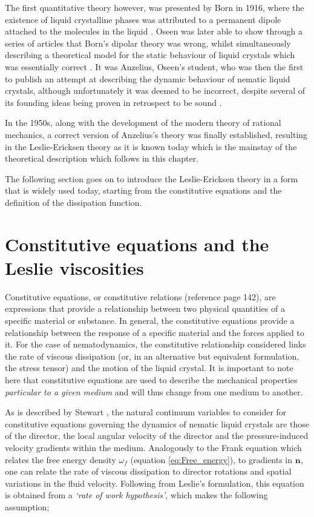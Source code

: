 The first quantitative theory however, was presented by Born in 1916, where the existence of liquid crystalline phases was attributed to a permanent dipole attached to the molecules in the liquid \cite{Taylor1999}. Oseen was later able to show through a series of articles that Born's dipolar theory was wrong, whilst simultaneously describing a theoretical model for the static behaviour of liquid crystals which was essentially correct \cite{Taylor1999}. It was Anzelius, Oseen's student, who was then the first to publish an attempt at describing the dynamic behaviour of nematic liquid crystals, although unfortunately it was deemed to be incorrect, despite several of its founding ideas being proven in retrospect to be sound \cite{Taylor1999}. 

In the 1950s, along with the development of the modern theory of rational mechanics, a correct version of Anzelius's theory was finally established, resulting in the Leslie-Ericksen theory as it is known today \cite{Taylor1999} which is the mainstay of the theoretical description which follows in this chapter. 

The following section goes on to introduce the Leslie-Ericksen theory in a form that is widely used today, starting from the constitutive equations and the definition of the dissipation function.

\section{Constitutive equations and the Leslie viscosities}

\label{sec:con_eq}
Constitutive equations, or constitutive relations (reference \cite{Stewart2004} page 142), are expressions that provide a relationship between two physical quantities of a specific material or substance. In general, the constitutive equations provide a relationship between the response of a specific material and the forces applied to it. For the case of nematodynamics, the constitutive relationship considered links the rate of viscous dissipation (or, in an alternative but equivalent formulation, the stress tensor) and the motion of the liquid crystal. It is important to note here that constitutive equations are used to describe the mechanical properties \textit{particular to a given medium} and will thus change from one medium to another. 

As is described by Stewart \cite{Stewart2004}, the natural continuum variables to consider for constitutive equations governing the dynamics of nematic liquid crystals are those of the director, the local angular velocity of the director and the pressure-induced velocity gradients within the medium. Analogously to the Frank equation which relates the free energy density $\omega_f$ (equation \ref{eq:Free_energy}), to gradients in $\mathbf{n}$, one can relate the rate of viscous dissipation to director rotations and spatial variations in the fluid velocity. Following from Leslie's \cite{Leslie1992} formulation, this equation is obtained from a \textit{`rate of work hypothesis'}, which makes the following assumption; 


